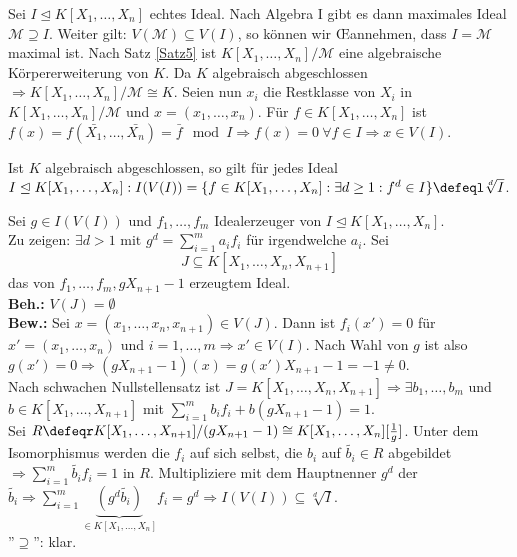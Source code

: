 \begin{Bew}
  Sei $I \trianglelefteq K[X_1, \dots, X_n]$ echtes Ideal. Nach Algebra I gibt es dann maximales Ideal $\mathcal{M} \supseteq I$. Weiter gilt: $V(\mathcal{M}) \subseteq V(I)$, so können wir \OE annehmen, dass $I = \mathcal{M}$ maximal ist.
  Nach Satz \ref{Satz5} ist $K[X_1, \dots, X_n]/\mathcal{M}$ eine algebraische Körpererweiterung von $K$.
  Da $K$ algebraisch abgeschlossen $\Rightarrow K[X_1, \dots, X_n]/\mathcal{M} \cong K$.
  Seien nun $x_i$ die Restklasse von $X_i$ in $K[X_1, \dots, X_n]/\mathcal{M}$ und $x = (x_1, \dots, x_n)$.
  Für $f \in K[X_1, \dots, X_n]$ ist $f(x) = f(\bar{X_1}, \dots, \bar{X_n}) = \bar{f} \mod I \Rightarrow f(x) = 0\ \forall f \in I \Rightarrow x \in V(I)$.
\end{Bew}

\begin{nnSatz}
  Ist $K$ algebraisch abgeschlossen, so gilt für jedes Ideal $I \trianglelefteq K[X_1, \dots, X_n]: I(V(I)) = \{ f \in K[X_1, \dots, X_n]: \exists d \ge 1: f^d \in I \} \defeql \sqrt[d]{I}$.
\end{nnSatz}

\begin{Bew}
  Sei $g \in I(V(I))$ und $f_1, \dots, f_m$ Idealerzeuger von $I \trianglelefteq K[X_1, \dots, X_n]$.\\
  Zu zeigen: $\exists d > 1 \text{ mit } g^d = \sum_{i = 1}^m a_i f_i$ für irgendwelche $a_i$.
  Sei 
  \[
  J \subseteq K[X_1, \dots, X_n, X_{n+1}]
  \]
  das von $f_1, \dots, f_m, gX_{n+1}-1$ erzeugtem Ideal.\\
  \textbf{Beh.:} $V(J) = \emptyset$\\
  \textbf{Bew.:} Sei $x = (x_1, \dots, x_n, x_{n+1}) \in V(J)$.
  Dann ist $f_i(x') = 0$ für $x' = (x_1, \dots, x_n)$ und $i = 1, \dots, m \Rightarrow x' \in V(I)$.
  Nach Wahl von $g$ ist also $g(x') = 0 \Rightarrow (gX_{n+1}-1)(x)
  = g(x') X_{n+1} - 1 = -1 \not= 0$.\\
  Nach schwachen Nullstellensatz ist $J = K[X_1, \dots, X_n,X_{n+1}] \Rightarrow \exists b_1,
  \dots, b_m$ und $b \in K[X_1, \dots, X_{n+1}]$ mit $\sum_{i=1}^m b_i f_i + b(gX_{n+1} - 1) = 1$.\\
  Sei $R \defeqr K[X_1, \dots, X_{n+1}]/ (gX_{n+1} - 1) \cong K[X_1, \dots, X_n][\frac{1}{g}]$. Unter dem Isomorphismus werden die $f_i$ auf sich selbst, die $b_i$ auf $\tilde{b_i} \in R$ abgebildet $\Rightarrow \sum_{i = 1}^m \tilde{b_i} f_i = 1 \text{ in } R$.
  Multipliziere mit dem Hauptnenner $g^d$ der $\tilde{b_i} \Rightarrow \sum_{i = 1}^m \underset{\in K[X_1, \dots, X_n]}{\underbrace{(g^d \tilde{b_i})}} f_i = g^d \Rightarrow I(V(I)) \subseteq \sqrt[d]{I}$.\\
  ''$\supseteq$'': klar.
\end{Bew}
